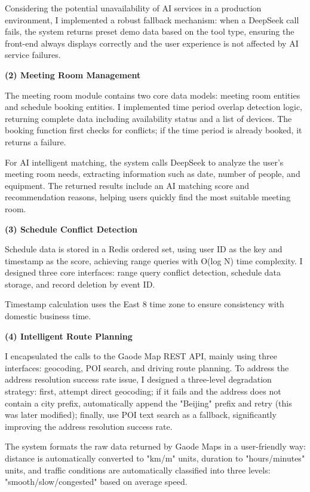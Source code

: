 Considering the potential unavailability of AI services in a production environment, I implemented a robust fallback mechanism: when a DeepSeek call fails, the system returns preset demo data based on the tool type, ensuring the front-end always displays correctly and the user experience is not affected by AI service failures.

\textbf{(2) Meeting Room Management}

The meeting room module contains two core data models: meeting room entities and schedule booking entities. I implemented time period overlap detection logic, returning complete data including availability status and a list of devices. The booking function first checks for conflicts; if the time period is already booked, it returns a failure.

For AI intelligent matching, the system calls DeepSeek to analyze the user's meeting room needs, extracting information such as date, number of people, and equipment. The returned results include an AI matching score and recommendation reasons, helping users quickly find the most suitable meeting room.

\textbf{(3) Schedule Conflict Detection}

Schedule data is stored in a Redis ordered set, using user ID as the key and timestamp as the score, achieving range queries with O(log N) time complexity. I designed three core interfaces: range query conflict detection, schedule data storage, and record deletion by event ID.

Timestamp calculation uses the East 8 time zone to ensure consistency with domestic business time.

\textbf{(4) Intelligent Route Planning}

I encapsulated the calls to the Gaode Map REST API, mainly using three interfaces: geocoding, POI search, and driving route planning. To address the address resolution success rate issue, I designed a three-level degradation strategy: first, attempt direct geocoding; if it fails and the address does not contain a city prefix, automatically append the "Beijing" prefix and retry (this was later modified); finally, use POI text search as a fallback, significantly improving the address resolution success rate.

The system formats the raw data returned by Gaode Maps in a user-friendly way: distance is automatically converted to "km/m" units, duration to "hours/minutes" units, and traffic conditions are automatically classified into three levels: "smooth/slow/congested" based on average speed.

